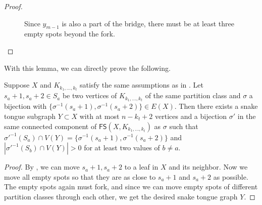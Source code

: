 \documentclass{mystyle}
\newcommand{\FS}{\mathsf{FS}}
\begin{document}
\begin{proof}
\begin{enumerate}
\begin{figure}[ht]
            \caption{Since $y_{m-1}$ is also a part of the bridge, there must be at least three empty spots beyond the fork.}
            \label{fig_11}
        \end{figure}
    \end{enumerate}
\end{proof}

With this lemma, we can directly prove the following.
\begin{proposition}\label{prop_snake_tongue}
    Suppose $X$ and $K_{k_1, \ldots, k_t}$ satisfy the same assumptions as in . Let $s_a + 1, s_a + 2 \in S_a$ be two vertices of $K_{k_1, \ldots, k_t}$ of the same partition class and $\sigma$ a bijection with $\{\sigma^{-1}(s_a + 1), \sigma^{-1}(s_a + 2)\} \in E(X)$. Then there exists a snake tongue subgraph $Y \subset X$ with at most $n - k_t + 2$ vertices and a bijection $\sigma'$ in the same connected component of $\FS(X, K_{k_1, \ldots, k_t})$ as $\sigma$ such that $\sigma'^{-1}(S_a) \cap V(Y) = \{\sigma^{-1}(s_a + 1), \sigma^{-1}(s_a + 2)\}$ and $|\sigma'^{-1}(S_b) \cap V(Y)| > 0$ for at least two values of $b \neq a$.
\end{proposition}
\begin{proof}
    By , we can move $s_a + 1, s_a + 2$ to a leaf in $X$ and its neighbor. Now we move all empty spots so that they are as close to $s_a + 1$ and $s_a + 2$ as possible. The empty spots again must fork, and since we can move empty spots of different partition classes through each other, we get the desired snake tongue graph $Y$. 
\end{proof}
\end{document}

